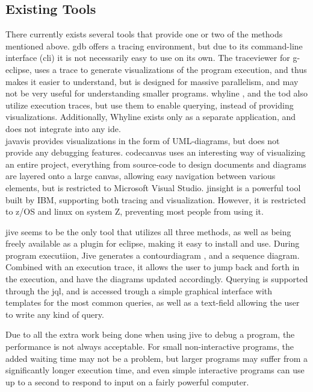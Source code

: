 \subsection{Existing Tools}\label{PreTools}
There currently exists several tools that provide one or two of the methods mentioned above.
\Gls{gdb} offers a tracing environment, but due to its command-line interface (\gls{cli})%
it is not necessarily easy to use on its own.
The \gls{traceviewer} \cite{Kranzlmuller} for g-eclipse, uses a trace to generate visualizations of the program execution, and thus makes it easier to understand, but is designed for massive parallelism, and may not be very useful for understanding smaller programs.
\Gls{whyline} \cite{ko2009}, and the \gls{tod} \cite{Pothier2007} also utilize execution traces, but use them to enable querying, instead of providing visualizations.
Additionally, Whyline exists only as a separate application, and does not integrate into any \gls{ide}.
~\\%

\Gls{javavis} \cite{Oechsle2002} provides visualizations in the form of UML-diagrams, but does not provide any debugging features.
\Gls{codecanvas} uses an interesting way of visualizing an entire project, everything from source-code to design documents and diagrams are layered onto a large canvas, allowing easy navigation between various elements, but is restricted to Microsoft Visual Studio.
\Gls{jinsight} \cite{Pauw} is a powerful tool built by IBM, supporting both tracing and visualization.
However, it is restricted to z/OS and linux on system Z, preventing most people from using it.
~\\

\begin{sloppypar}
\Gls{jive} seems to be the only tool that utilizes all three methods, as well as being freely available as a plugin for eclipse, making it easy to install and use.
During program executiion, Jive generates a \gls{contourdiagram} \cite{Jayaraman1996}, and a sequence diagram.
Combined with an execution trace, it allows the user to jump back and forth in the execution, and have the diagrams updated accordingly.
Querying is supported through the \gls{jql}, and is accessed trough a simple graphical interface with templates for the most common queries, as well as a text-field allowing the user to write any kind of query.
~\\
\end{sloppypar}

Due to all the extra work being done when using jive to debug a program, the performance is not always acceptable.
For small non-interactive programs, the added waiting time may not be a problem, but larger programs may suffer from a significantly longer execution time, and even simple interactive programs can use up to a second to respond to input on a fairly powerful computer.
~\\





